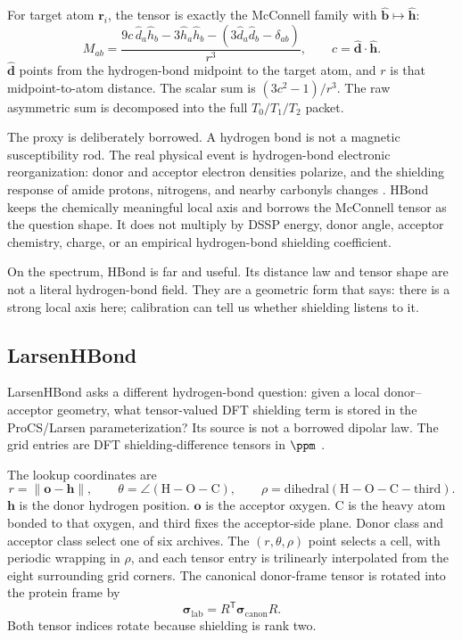 \documentclass[11pt]{article}
\begin{document}
For target atom \(\bm r_i\), the tensor is exactly the McConnell family with
\(\hat{\bm b}\mapsto\hat{\bm h}\):
\[
  M_{ab}
  =
  \frac{
    9c\,\hat d_a\hat h_b
    -3\hat h_a\hat h_b
    -\left(3\hat d_a\hat d_b-\delta_{ab}\right)}
  {r^3},
  \qquad
  c=\hat{\bm d}\cdot\hat{\bm h}.
\]
\(\hat{\bm d}\) points from the hydrogen-bond midpoint to the target atom, and
\(r\) is that midpoint-to-atom distance. The scalar sum is
\((3c^2-1)/r^3\). The raw asymmetric sum is decomposed into the full
\(T_0/T_1/T_2\) packet.

The proxy is deliberately borrowed. A hydrogen bond is not a magnetic
susceptibility rod. The real physical event is hydrogen-bond electronic
reorganization: donor and acceptor electron densities polarize, and the
shielding response of amide protons, nitrogens, and nearby carbonyls changes
\cite{parker2006,larsen2015}. HBond keeps the chemically meaningful local axis
and borrows the McConnell tensor as the question shape. It does not multiply by
DSSP energy, donor angle, acceptor chemistry, charge, or an empirical
hydrogen-bond shielding coefficient.

On the spectrum, HBond is far and useful. Its distance law and tensor shape are
not a literal hydrogen-bond field. They are a geometric form that says: there
is a strong local axis here; calibration can tell us whether shielding listens
to it.

\subsection{LarsenHBond}

LarsenHBond asks a different hydrogen-bond question: given a local
donor--acceptor geometry, what tensor-valued DFT shielding term is stored in
the ProCS/Larsen parameterization? Its source is not a borrowed dipolar law.
The grid entries are DFT shielding-difference tensors in \(\si{\ppm}\)
\cite{larsen2015}.

The lookup coordinates are
\[
  r=\|\bm o-\bm h\|,
  \qquad
  \theta=\angle(\mathrm H-\mathrm O-\mathrm C),
  \qquad
  \rho=\mathrm{dihedral}(\mathrm H-\mathrm O-\mathrm C-\mathrm{third}).
\]
\(\bm h\) is the donor hydrogen position. \(\bm o\) is the acceptor oxygen.
\(\mathrm C\) is the heavy atom bonded to that oxygen, and
\(\mathrm{third}\) fixes the acceptor-side plane. Donor class and acceptor
class select one of six archives. The \((r,\theta,\rho)\) point selects a cell,
with periodic wrapping in \(\rho\), and each tensor entry is trilinearly
interpolated from the eight surrounding grid corners. The canonical donor-frame
tensor is rotated into the protein frame by
\[
  \bm\sigma_{\mathrm{lab}}
  =
  R^{\mathsf T}\bm\sigma_{\mathrm{canon}}R .
\]
Both tensor indices rotate because shielding is rank two.
\end{document}
